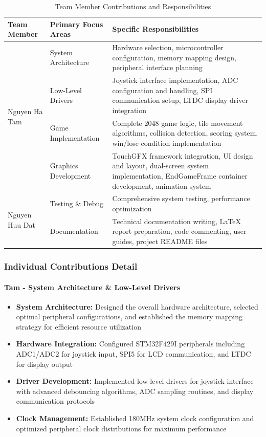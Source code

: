 \documentclass[12pt,a4paper]{article}
\begin{document}
\begin{table}[H]
\centering
\caption{Team Member Contributions and Responsibilities}
\label{tab:team_contributions}
\begin{tabular}{|l|l|p{8cm}|}
\hline
\textbf{Team Member} & \textbf{Primary Focus Areas} & \textbf{Specific Responsibilities} \\
\hline
\multirow{4}{*}{Nguyen Ha Tam} & System Architecture & Hardware selection, microcontroller configuration, memory mapping design, peripheral interface planning \\
\cline{2-3}
& Low-Level Drivers & Joystick interface implementation, ADC configuration and handling, SPI communication setup, LTDC display driver integration \\
\hline
\multirow{4}{*}{Dinh Ngoc Cam} & Game Implementation & Complete 2048 game logic, tile movement algorithms, collision detection, scoring system, win/lose condition implementation \\
\cline{2-3}
& Graphics Development & TouchGFX framework integration, UI design and layout, dual-screen system implementation, EndGameFrame container development, animation system \\
\hline
\multirow{4}{*}{Nguyen Huu Dat} & Testing \& Debug & Comprehensive system testing, performance optimization \\
\cline{2-3}
& Documentation & Technical documentation writing, LaTeX report preparation, code commenting, user guides, project README files \\
\hline
\end{tabular}
\end{table}

\subsubsection{Individual Contributions Detail}

\paragraph{Tam - System Architecture \& Low-Level Drivers}
\begin{itemize}[leftmargin=*]
    \item \textbf{System Architecture:} Designed the overall hardware architecture, selected optimal peripheral configurations, and established the memory mapping strategy for efficient resource utilization
    \item \textbf{Hardware Integration:} Configured STM32F429I peripherals including ADC1/ADC2 for joystick input, SPI5 for LCD communication, and LTDC for display output
    \item \textbf{Driver Development:} Implemented low-level drivers for joystick interface with advanced debouncing algorithms, ADC sampling routines, and display communication protocols
    \item \textbf{Clock Management:} Established 180MHz system clock configuration and optimized peripheral clock distributions for maximum performance
\end{itemize}
\end{document}
